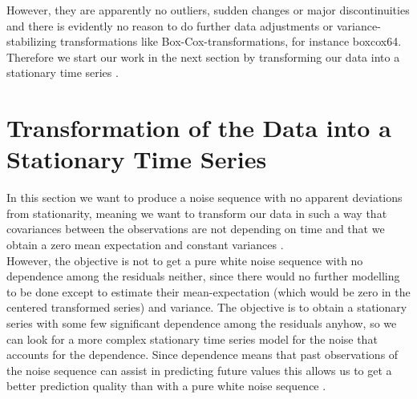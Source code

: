 \documentclass[11pt,a4paper]{article}
\begin{document}
However, they are apparently no outliers, sudden changes or major discontinuities and there is evidently no reason to do further data adjustments or variance-stabilizing transformations like Box-Cox-transformations, for instance {boxcox64}. Therefore we start our work in the next section by transforming our data into a stationary time series \cite[p.~45--82]{bd02}.

\section{Transformation of the Data into a Stationary Time Series}
In this section we want to produce a noise sequence with no apparent deviations from stationarity, meaning we want to transform our data in such a way that covariances between the observations are not depending on time and that we obtain a zero mean expectation and constant variances \cite[pp.~14--23]{bd02}. \\
However, the objective is not to get a pure white noise sequence  with no dependence among the residuals neither, since there would no further modelling to be done except to estimate their mean-expectation (which would be zero in the centered transformed series) and variance. The objective is to obtain a stationary series with some few significant dependence among the residuals anyhow, so we can look for a more complex stationary time series model for the noise that accounts for the dependence. Since dependence means that past observations of the noise sequence can assist in predicting future values this allows us to get a better prediction quality than with a pure white noise sequence \cite[p.~35]{bd02}. \\
\end{document}
